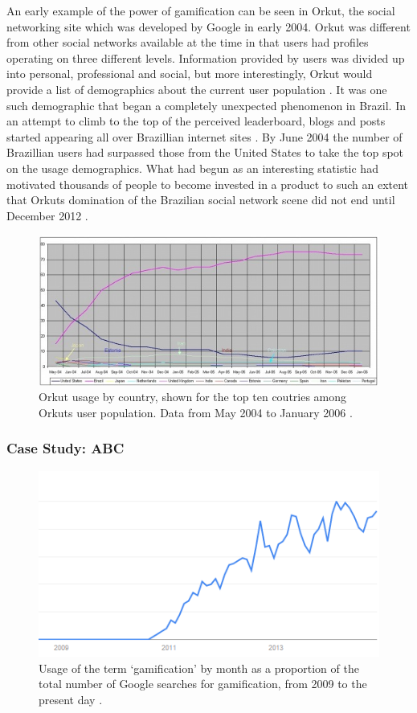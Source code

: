 \documentclass{article}
\begin{document}
An early example of the power of gamification can be seen in Orkut, the social networking site which was developed by Google in early 2004. Orkut was different from other social networks available at the time in that users had profiles operating on three different levels. Information provided by users was divided up into personal, professional and social, but more interestingly, Orkut would provide a list of demographics about the current user population \cite{fragoso2006wtf}. It was one such demographic that began a completely unexpected phenomenon in Brazil. In an attempt to climb to the top of the perceived leaderboard, blogs and posts started appearing all over Brazillian internet sites \cite{zichermann2010game}.  By June 2004 the number of Brazillian users had surpassed those from the United States to take the top spot on the usage demographics. What had begun as an interesting statistic had motivated thousands of people to become invested in a product to such an extent that Orkuts domination of the Brazilian social network scene did not end until December 2012 \cite{1_comscore_2012}.

\begin{figure}
	\includegraphics{../img/orkut-brazil.jpg}
	\caption{Orkut usage by country, shown for the top ten coutries among Orkuts user population. Data from May 2004 to January 2006 \cite{fragoso2006wtf}.}
	\label{orkut-brazil}
\end{figure}

\subsubsection{Case Study: ABC}

\begin{figure}
	\includegraphics{../img/usage-graph.png}
	\caption{Usage of the term `gamification' by month as a proportion of the total number of Google searches for gamification, from 2009 to the present day \cite{usage}.}
	\label{usagegraph}
\end{figure}
\end{document}
